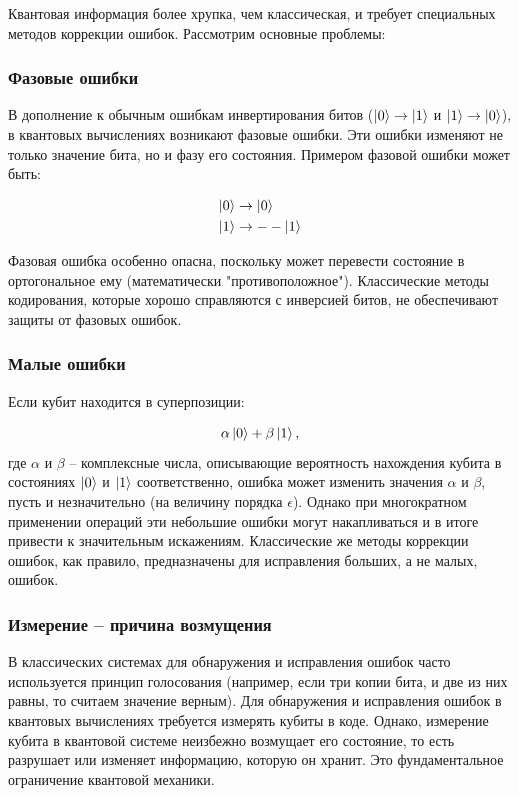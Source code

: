 \documentclass[12pt,a4paper]{article}
\begin{document}
	Квантовая информация более хрупка, чем классическая, и требует специальных методов коррекции ошибок. Рассмотрим основные проблемы:
	
	\subsubsection{Фазовые ошибки}
	
	В дополнение к обычным ошибкам инвертирования битов (\(\ket{0}\rightarrow\ket{1}\) и \(\ket{1}\rightarrow\ket{0}\)), в квантовых вычислениях возникают фазовые ошибки. Эти ошибки изменяют не только значение бита, но и фазу его состояния. Примером фазовой ошибки может быть:
	
	\begin{align}
		\ket{0} &\rightarrow \ket{0} \\
		\ket{1} &\rightarrow --\ket{1}
	\end{align}
	
	Фазовая ошибка особенно опасна, поскольку может перевести состояние в ортогональное ему (математически "противоположное"). Классические методы кодирования, которые хорошо справляются с инверсией битов, не обеспечивают защиты от фазовых ошибок.
	
	\subsubsection{Малые ошибки}
	
	Если кубит находится в суперпозиции:
	
	\begin{equation}
		\alpha\ket{0} + \beta\ket{1},
	\end{equation}
	где \(\alpha\) и \(\beta\) – комплексные числа, описывающие вероятность нахождения кубита в состояниях \(\ket{0}\) и \(\ket{1}\) соответственно, ошибка может изменить значения \(\alpha\) и \(\beta\), пусть и незначительно (на величину порядка \(\epsilon\)). Однако при многократном применении операций эти небольшие ошибки могут накапливаться и в итоге привести к значительным искажениям. Классические же методы коррекции ошибок, как правило, предназначены для исправления больших, а не малых, ошибок.
	
	\subsubsection{Измерение – причина возмущения}
	
	В классических системах для обнаружения и исправления ошибок часто используется принцип голосования (например, если три копии бита, и две из них равны, то считаем значение верным). Для обнаружения и исправления ошибок в квантовых вычислениях требуется измерять кубиты в коде. Однако, измерение кубита в квантовой системе неизбежно возмущает его состояние, то есть разрушает или изменяет информацию, которую он хранит. Это фундаментальное ограничение квантовой механики.
	
\end{document}
